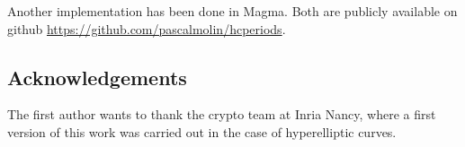 \documentclass[main.tex]{subfiles}
\begin{document}
  Another implementation has been done in Magma. Both are publicly available
  on github \url{https://github.com/pascalmolin/hcperiods}.

  \subsection{Acknowledgements}

  The first author wants to thank the crypto team at Inria Nancy, where
  a first version of this work was carried out in the case of hyperelliptic
  curves.
\end{document}
